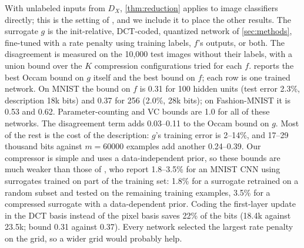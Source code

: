 With unlabeled inputs from $D_X$, \cref{thm:reduction} applies to image classifiers directly; this is the setting of \citet{bazinet2026bound}, and we include it to place the other results. The surrogate $g$ is the init-relative, DCT-coded, quantized network of \cref{sec:methods}, fine-tuned with a rate penalty using training labels, $f$'s outputs, or both. The disagreement is measured on the 10{,}000 test images without their labels, with a union bound over the $K$ compression configurations tried for each $f$.  reports the best Occam bound on $g$ itself and the best bound on $f$; each row is one trained network. On MNIST the bound on $f$ is 0.31 for 100 hidden units (test error 2.3\%, description 18k bits) and 0.37 for 256 (2.0\%, 28k bits); on Fashion-MNIST it is 0.53 and 0.62. Parameter-counting and VC bounds are 1.0 for all of these networks. The disagreement term adds 0.03--0.11 to the Occam bound on $g$. Most of the rest is the cost of the description: $g$'s training error is 2--14\%, and 17--29 thousand bits against $m=60000$ examples add another 0.24--0.39. Our compressor is simple and uses a data-independent prior, so these bounds are much weaker than those of \citet{bazinet2026bound}, who report 1.8--3.5\% for an MNIST CNN using surrogates trained on part of the training set: 1.8\% for a surrogate retrained on a random subset and tested on the remaining training examples, 3.5\% for a compressed surrogate with a data-dependent prior. Coding the first-layer update in the DCT basis instead of the pixel basis saves 22\% of the bits (18.4k against 23.5k; bound 0.31 against 0.37). Every network selected the largest rate penalty on the grid, so a wider grid would probably help.


